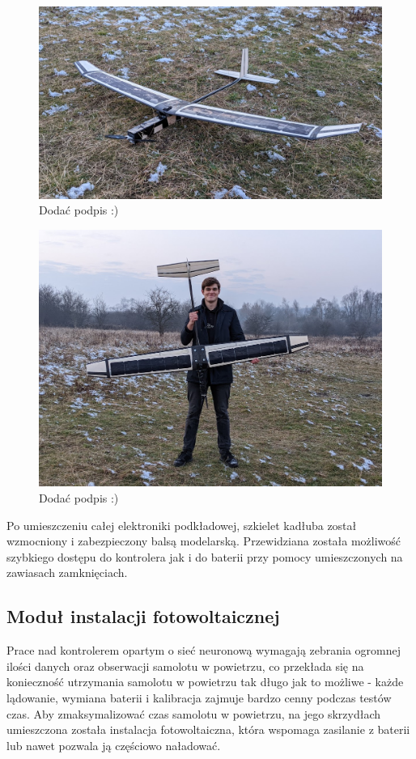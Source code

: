 \documentclass[12pt, a4paper]{article}
\begin{document}
\begin{figure}[ht]
    \centering
    \includegraphics[width=1\textwidth]{caly}
    \caption{Dodać podpis :)}
\end{figure}
\begin{figure}[ht]
    \centering
    \includegraphics[width=1\textwidth]{budowa16}
    \caption{Dodać podpis :)}
\end{figure}
Po umieszczeniu całej elektroniki podkładowej, szkielet kadłuba został wzmocniony i zabezpieczony balsą modelarską. Przewidziana została możliwość szybkiego dostępu do kontrolera jak i do baterii przy pomocy umieszczonych na zawiasach zamknięciach.

 \FloatBarrier
\subsection{Moduł instalacji fotowoltaicznej}
Prace nad kontrolerem opartym o sieć neuronową wymagają zebrania ogromnej ilości danych oraz obserwacji samolotu w powietrzu, co przekłada się na konieczność utrzymania samolotu w powietrzu tak długo jak to możliwe - każde lądowanie, wymiana baterii i kalibracja zajmuje bardzo cenny podczas testów czas. Aby zmaksymalizować czas samolotu w powietrzu, na jego skrzydłach umieszczona została instalacja fotowoltaiczna, która wspomaga zasilanie z baterii lub nawet pozwala ją częściowo naładować.
\end{document}
